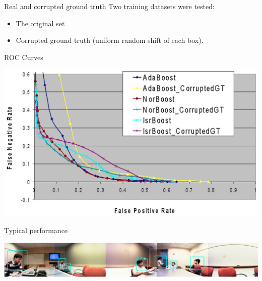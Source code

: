 \documentclass{beamer}
\begin{document}


	\begin{frame}{Real and corrupted ground truth}
		Two training datasets were tested:
			\begin{itemize}
				\item The original set
				\item Corrupted ground truth (uniform random shift of each box).
			\end{itemize}
	\end{frame}


	\begin{frame}{ROC Curves}
		\begin{center}
			\includegraphics[width=1\textwidth]{roc-curves.png}
		\end{center}
	\end{frame}


	\begin{frame}{Typical performance}
		\begin{center}
			\includegraphics[width=1\textwidth]{results-image.png}
		\end{center}
	\end{frame}
\end{document}
